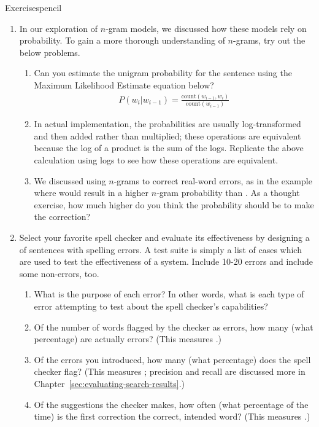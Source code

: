 \begin{tblsfilledsymbol}{Exercises}{pencil}
\begin{enumerate}
 \item  In our exploration of $n$-gram models, we discussed how these models rely on probability.  To gain a more thorough understanding of $n$-grams, try out the below problems. 
 \begin{enumerate}
    \item Can you estimate the unigram probability for the sentence  using the Maximum Likelihood Estimate equation below?
    \begin{gather*}
        P(w_i|w_{i-1}) = \frac{\text{count}(w_{i-1},w_i)}{\text{count}(w_{i-1})}
    \end{gather*}
    \item In actual implementation, the probabilities are usually log-transformed and then added rather than multiplied; these operations are equivalent because the log of a product is the sum of the logs.  Replicate the above calculation using logs to see how these operations are equivalent.  
    \item We discussed using $n$-grams to correct real-word errors, as in the example where  would result in a higher $n$-gram probability than .  As a thought exercise, how much higher do you think the probability should be to make the correction?
 \end{enumerate}

\item  Select your favorite spell checker and evaluate its effectiveness by designing a  of sentences with spelling errors.  A test suite is simply a list of cases which   are used to test the effectiveness of a system.  Include 10-20   errors and include some non-errors, too.
  \begin{enumerate}
  \item What is the purpose of each error?  In other words, what is    each type of error attempting to test about the spell checker's  capabilities?
  \item Of the number of words flagged by the checker as errors, how    many (what percentage) are actually errors?  (This measures    .)
  \item Of the errors you introduced, how many (what percentage) does the  spell checker flag?  (This measures ; precision and recall are discussed more in Chapter~\ref{sec:evaluating-search-results}.)
  \item Of the suggestions the checker makes, how often (what
    percentage of the time) is the first correction the correct,
    intended word?  (This measures .)
  \end{enumerate}


\end{enumerate}
\end{tblsfilledsymbol}
